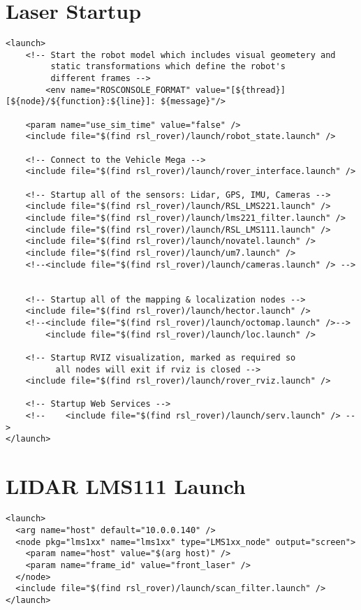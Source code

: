 \section*{Laser Startup}
\begin{lstlisting}[breaklines=true,basicstyle=\tiny]
<launch>
	<!-- Start the robot model which includes visual geometery and
	     static transformations which define the robot's
	     different frames -->	
        <env name="ROSCONSOLE_FORMAT" value="[${thread}] [${node}/${function}:${line}]: ${message}"/>

	<param name="use_sim_time" value="false" />
	<include file="$(find rsl_rover)/launch/robot_state.launch" />

	<!-- Connect to the Vehicle Mega -->
	<include file="$(find rsl_rover)/launch/rover_interface.launch" /> 

	<!-- Startup all of the sensors: Lidar, GPS, IMU, Cameras -->
	<include file="$(find rsl_rover)/launch/RSL_LMS221.launch" /> 
	<include file="$(find rsl_rover)/launch/lms221_filter.launch" />
	<include file="$(find rsl_rover)/launch/RSL_LMS111.launch" />
	<include file="$(find rsl_rover)/launch/novatel.launch" />
	<include file="$(find rsl_rover)/launch/um7.launch" />
	<!--<include file="$(find rsl_rover)/launch/cameras.launch" /> -->


	<!-- Startup all of the mapping & localization nodes -->
	<include file="$(find rsl_rover)/launch/hector.launch" />
	<!--<include file="$(find rsl_rover)/launch/octomap.launch" />-->
        <include file="$(find rsl_rover)/launch/loc.launch" />

	<!-- Startup RVIZ visualization, marked as required so
	      all nodes will exit if rviz is closed -->
	<include file="$(find rsl_rover)/launch/rover_rviz.launch" />

	<!-- Startup Web Services -->
	<!--	<include file="$(find rsl_rover)/launch/serv.launch" /> -->
</launch>
\end{lstlisting}


\section*{LIDAR LMS111 Launch}
\begin{lstlisting}[breaklines=true,basicstyle=\tiny]
<launch>
  <arg name="host" default="10.0.0.140" />
  <node pkg="lms1xx" name="lms1xx" type="LMS1xx_node" output="screen">
    <param name="host" value="$(arg host)" />
    <param name="frame_id" value="front_laser" />
  </node>
  <include file="$(find rsl_rover)/launch/scan_filter.launch" />
</launch>
\end{lstlisting}


